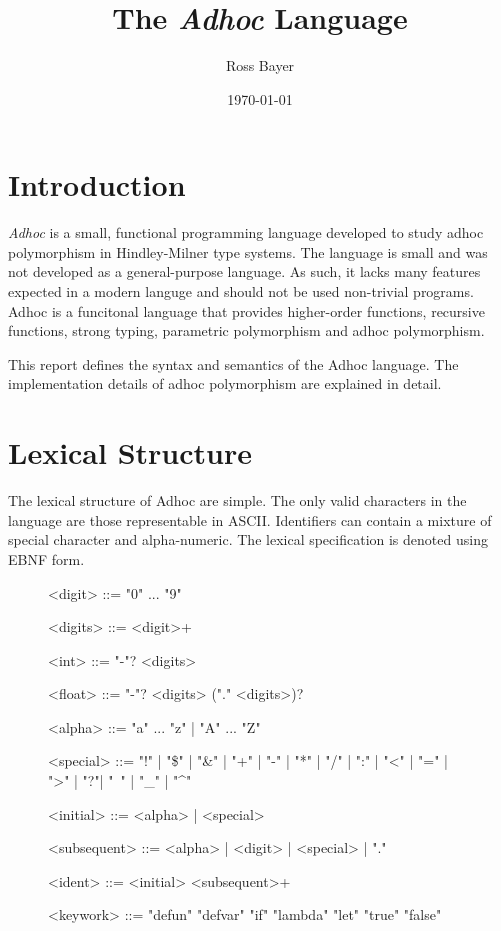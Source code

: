 \documentclass[11pt,a4paper]{article}
\title{The \textit{Adhoc} Language}
\author{Ross Bayer}
\date{\today}
\begin{document}
\maketitle



\section{Introduction}

\textit{Adhoc} is a small, functional programming language developed to study
adhoc polymorphism in Hindley-Milner type systems. The language is small and
was not developed as a general-purpose language. As such, it lacks many features
expected in a modern languge and should not be used non-trivial programs. Adhoc
is a funcitonal language that provides higher-order functions, recursive
functions, strong typing, parametric polymorphism and adhoc polymorphism.

This report defines the syntax and semantics of the Adhoc language. The
implementation details of adhoc polymorphism are explained in detail.



\section{Lexical Structure}

The lexical structure of Adhoc are simple. The only valid characters in the
language are those representable in ASCII. Identifiers can contain a mixture of
special character and alpha-numeric. The lexical specification is denoted using
EBNF form.


\begin{figure}[H]
\small
\renewcommand{\grammarlabel}[2]{\synt{#1}\hfill#2}
\setlength{\grammarindent}{8em}
\begin{grammar}
<digit> ::= "0" ... "9"

<digits> ::= <digit>+

<int> ::= "-"? <digits>

<float> ::= "-"? <digits> ("." <digits>)?

<alpha> ::= "a" ... "z" | "A" ... "Z"

<special> ::= "!" | "\$" | "\&" | "+" | "-" | "*" | "/" | ":" | "<" | "=" | ">" | "?"| "~" | "_" | "^"

<initial> ::= <alpha> | <special>

<subsequent> ::= <alpha> | <digit> | <special> | "."

<ident> ::= <initial> <subsequent>+

<keywork> ::= "defun"
    \alt "defvar"
    \alt "if"
    \alt "lambda"
    \alt "let"
    \alt "true"
    \alt "false"
\end{grammar}
\end{figure}
\end{document}
